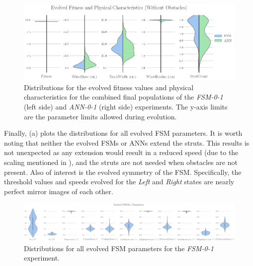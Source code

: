 \begin{figure}[!ht]
    \centering

    \includegraphics[width=\columnwidth]{figures/4-results/0-1-best_params.png}

    \caption{Distributions for the evolved fitness values and physical characteristics for the combined final populations of the \emph{FSM-0-1} (left side) and \emph{ANN-0-1} (right side) experiments. The y-axis limits are the parameter limits allowed during evolution.}
    \label{fig:0-1-best-params}

    \vspace{-0.2in}

\end{figure}


Finally, (a) plots the distributions for all evolved FSM parameters.
%
It is worth noting that neither the evolved FSMs or ANNs extend the struts.
%
This results is not unexpected as any extension would result in a reduced speed (due to the scaling mentioned in ), and the struts are not needed when obstacles are not present.
%
Also of interest is the evolved symmetry of the FSM.
%
Specifically, the threshold values and speeds evolved for the \emph{Left} and \emph{Right} states are nearly perfect mirror images of each other.


\begin{figure}[!ht]
    \centering


    \includegraphics[width=\textwidth]{figures/4-results/FSM-0-1-best_params.png}

    \caption{Distributions for all evolved FSM parameters for the \emph{FSM-0-1} experiment.}
    \label{fig:FSM-best-params}
\end{figure}



